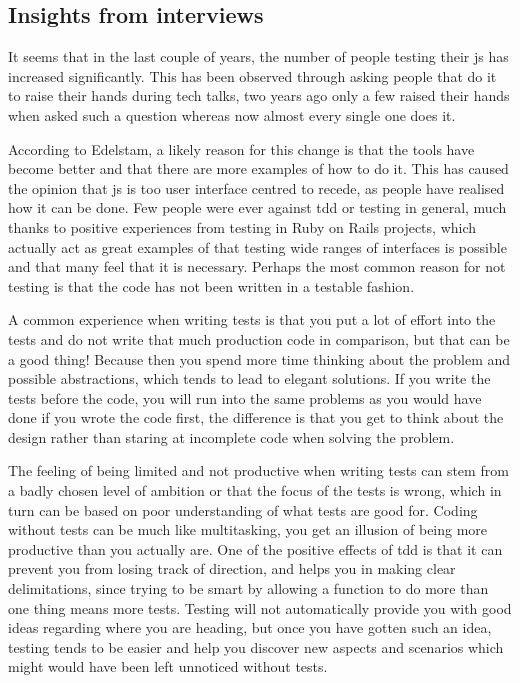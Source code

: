 \documentclass[11pt]{article}
\begin{document}
\subsection{Insights from interviews}

It seems that in the last couple of years, the number of people testing their \gls{js} has increased significantly\cite[question~1]{Edelstam}. This has been observed through asking people that do it to raise their hands during tech talks, two years ago only a few raised their hands when asked such a question whereas now almost every single one does it.

According to Edelstam, a likely reason for this change is that the tools have become better and that there are more examples of how to do it. This has caused the opinion that \gls{js} is too user interface centred to recede, as people have realised how it can be done. Few people were ever against \gls{tdd} or testing in general, much thanks to positive experiences from testing in Ruby on Rails projects, which actually act as great examples of that testing wide ranges of interfaces is possible and that many feel that it is necessary. Perhaps the most common reason for not testing is that the code has not been written in a testable fashion. \cite[questions~2-3]{Edelstam}

A common experience when writing tests is that you put a lot of effort into the tests and do not write that much production code in comparison, but that can be a good thing! Because then you spend more time thinking about the problem and possible abstractions, which tends to lead to elegant solutions. If you write the tests before the code, you will run into the same problems as you would have done if you wrote the code first, the difference is that you get to think about the design rather than staring at incomplete code when solving the problem. \cite[question~8]{Edelstam}

The feeling of being limited and not productive when writing tests can stem from a badly chosen level of ambition or that the focus of the tests is wrong, which in turn can be based on poor understanding of what tests are good for. Coding without tests can be much like multitasking, you get an illusion of being more productive than you actually are. One of the positive effects of \gls{tdd} is that it can prevent you from losing track of direction, and helps you in making clear delimitations, since trying to be smart by allowing a function to do more than one thing means more tests. Testing will not automatically provide you with good ideas regarding where you are heading, but once you have gotten such an idea, testing tends to be easier and help you discover new aspects and scenarios which might would have been left unnoticed without tests. \cite[question~8]{Edelstam}
\end{document}
